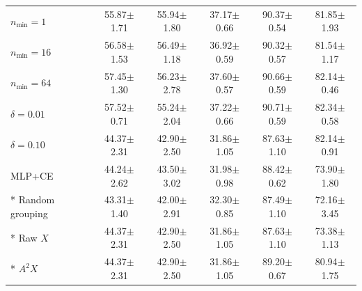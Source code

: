 \begin{longtable}{@{}lccccc@{}}
\(n_{\min}=1\) & 55.87\ensuremath{\pm}1.71 & 55.94\ensuremath{\pm}1.80 & 37.17\ensuremath{\pm}0.66 & 90.37\ensuremath{\pm}0.54 & 81.85\ensuremath{\pm}1.93 \\
\(n_{\min}=16\) & 56.58\ensuremath{\pm}1.53 & 56.49\ensuremath{\pm}1.18 & 36.92\ensuremath{\pm}0.59 & 90.32\ensuremath{\pm}0.57 & 81.54\ensuremath{\pm}1.17 \\
\(n_{\min}=64\) & 57.45\ensuremath{\pm}1.30 & 56.23\ensuremath{\pm}2.78 & 37.60\ensuremath{\pm}0.57 & 90.66\ensuremath{\pm}0.59 & 82.14\ensuremath{\pm}0.46 \\
\(\delta=0.01\) & 57.52\ensuremath{\pm}0.71 & 55.24\ensuremath{\pm}2.04 & 37.22\ensuremath{\pm}0.66 & 90.71\ensuremath{\pm}0.59 & 82.34\ensuremath{\pm}0.58 \\
\(\delta=0.10\) & 44.37\ensuremath{\pm}2.31 & 42.90\ensuremath{\pm}2.50 & 31.86\ensuremath{\pm}1.05 & 87.63\ensuremath{\pm}1.10 & 82.14\ensuremath{\pm}0.91 \\
\midrule
MLP+CE & 44.24\ensuremath{\pm}2.62 & 43.50\ensuremath{\pm}3.02 & 31.98\ensuremath{\pm}0.98 & 88.42\ensuremath{\pm}0.62 & 73.90\ensuremath{\pm}1.80 \\*
Random grouping & 43.31\ensuremath{\pm}1.40 & 42.00\ensuremath{\pm}2.91 & 32.30\ensuremath{\pm}0.85 & 87.49\ensuremath{\pm}1.10 & 72.16\ensuremath{\pm}3.45 \\*
Raw \(X\) & 44.37\ensuremath{\pm}2.31 & 42.90\ensuremath{\pm}2.50 & 31.86\ensuremath{\pm}1.05 & 87.63\ensuremath{\pm}1.10 & 73.38\ensuremath{\pm}1.13 \\*
\(A^2X\) & 44.37\ensuremath{\pm}2.31 & 42.90\ensuremath{\pm}2.50 & 31.86\ensuremath{\pm}1.05 & 89.20\ensuremath{\pm}0.67 & 80.94\ensuremath{\pm}1.75 \\
\end{longtable}
\endgroup
